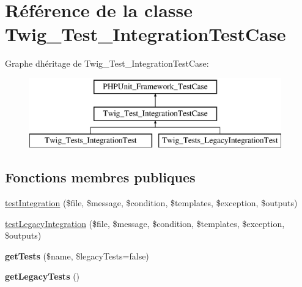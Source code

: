 \hypertarget{class_twig___test___integration_test_case}{}\section{Référence de la classe Twig\+\_\+\+Test\+\_\+\+Integration\+Test\+Case}
\label{class_twig___test___integration_test_case}
Graphe d\textquotesingle{}héritage de Twig\+\_\+\+Test\+\_\+\+Integration\+Test\+Case\+:\begin{figure}[H]
\begin{center}
\leavevmode
\includegraphics[height=3.000000cm]{class_twig___test___integration_test_case}
\end{center}
\end{figure}
\subsection*{Fonctions membres publiques}
\begin{DoxyCompactItemize}
\item 
\hyperlink{class_twig___test___integration_test_case_a629a9bbe20e0bf98cb8a148687d3d154}{test\+Integration} (\$file, \$message, \$condition, \$templates, \$exception, \$outputs)
\item 
\hyperlink{class_twig___test___integration_test_case_aaf57b41c6bcbdf786bdfe57292a4cfde}{test\+Legacy\+Integration} (\$file, \$message, \$condition, \$templates, \$exception, \$outputs)
\item 
{\bfseries get\+Tests} (\$name, \$legacy\+Tests=false)\hypertarget{class_twig___test___integration_test_case_a22f6ec737c4c30659ba90780e5f20fd3}{}\label{class_twig___test___integration_test_case_a22f6ec737c4c30659ba90780e5f20fd3}

\item 
{\bfseries get\+Legacy\+Tests} ()\hypertarget{class_twig___test___integration_test_case_ab614d3535cfc2ca14d5ef22f6bd953d5}{}\label{class_twig___test___integration_test_case_ab614d3535cfc2ca14d5ef22f6bd953d5}

\end{DoxyCompactItemize}

